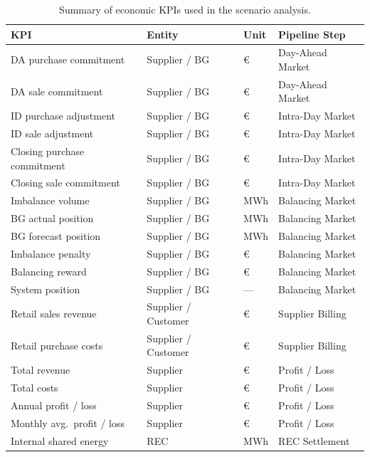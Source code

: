 \begin{table}[htbp]
\centering
\caption{Summary of economic KPIs used in the scenario analysis.}
\label{tab:kpi_summary}
\renewcommand{\arraystretch}{1.35}
\begin{tabular}{@{}llll@{}}
\toprule
\textbf{KPI} & \textbf{Entity} & \textbf{Unit} & \textbf{Pipeline Step} \\
\midrule
DA purchase commitment        & Supplier / BG  & \euro      & Day-Ahead Market \\
DA sale commitment            & Supplier / BG  & \euro      & Day-Ahead Market \\
ID purchase adjustment        & Supplier / BG  & \euro      & Intra-Day Market \\
ID sale adjustment            & Supplier / BG  & \euro      & Intra-Day Market \\
Closing purchase commitment   & Supplier / BG  & \euro      & Intra-Day Market \\
Closing sale commitment       & Supplier / BG  & \euro      & Intra-Day Market \\
\addlinespace
Imbalance volume              & Supplier / BG  & MWh        & Balancing Market \\
BG actual position            & Supplier / BG  & MWh        & Balancing Market \\
BG forecast position          & Supplier / BG  & MWh        & Balancing Market \\
Imbalance penalty             & Supplier / BG  & \euro      & Balancing Market \\
Balancing reward              & Supplier / BG  & \euro      & Balancing Market \\
System position               & Supplier / BG  & ---        & Balancing Market \\
\addlinespace
Retail sales revenue          & Supplier / Customer & \euro & Supplier Billing \\
Retail purchase costs         & Supplier / Customer & \euro & Supplier Billing \\
\addlinespace
Total revenue                 & Supplier       & \euro      & Profit / Loss    \\
Total costs                   & Supplier       & \euro      & Profit / Loss    \\
Annual profit / loss          & Supplier       & \euro      & Profit / Loss    \\
Monthly avg.\ profit / loss   & Supplier       & \euro      & Profit / Loss    \\
\addlinespace
Internal shared energy        & REC            & MWh        & REC Settlement   \\
\bottomrule
\end{tabular}
\end{table}

